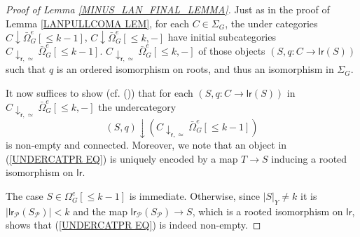 \documentclass[a4paper,10pt]{article}%
\begin{document}
\begin{proof}[Proof of Lemma \ref{MINUS_LAN_FINAL_LEMMA}]
  Just as in the proof of Lemma \ref{LANPULLCOMA LEM}, for each 
  $C \in \Sigma_G$, 
  the under categories
  $C \downarrow \bar{\Omega}_G^e[\leq k-1]$,
  $C \downarrow \bar{\Omega}_G^e[\leq k,-]$
  have initial subcategories 
  $C \downarrow_{\mathsf{r},\simeq} \bar{\Omega}_G^e[\leq k-1]$.
  $C \downarrow_{\mathsf{r},\simeq} \bar{\Omega}_G^e[\leq k,-]$
  of those objects
  $(S,q \colon C \to \mathsf{lr}(S))$ such that 
  $q$ is an ordered isomorphism on roots,
  and thus an isomorphism in $\Sigma_G$.

  It now suffices to show (cf. (\cite[X.3.1]{McL})) that for each
  $(S,q \colon C \to \mathsf{lr}(S))$ in 
  $C \downarrow_{\mathsf{r},\simeq} \bar{\Omega}_G^e[\leq k,-]$
  the undercategory
  \begin{equation}\label{UNDERCATPR EQ}
    (S,q) \downarrow  
    (C \downarrow_{\mathsf{r},\simeq} \bar{\Omega}_G^e[\leq k-1])
  \end{equation}
  is non-empty and connected. 
  Moreover, we note that an object in 
  (\ref{UNDERCATPR EQ})
  is uniquely encoded by a map $T \to S$ inducing a rooted isomorphism on $\mathsf{lr}$.

  The case $S\in \Omega_G^e[\leq k-1]$ is immediate. 
  Otherwise, since $|S|_Y \neq k$ it is
  $|\mathsf{lr}_{\mathcal{P}}(S_{\mathcal{P}})|<k$
  and the map 
  $\mathsf{lr}_{\mathcal{P}}(S_{\mathcal{P}}) \to S$,
  which is a rooted isomorphism on $\mathsf{lr}$, shows that
  (\ref{UNDERCATPR EQ}) is indeed non-empty.


\end{proof}
\end{document}
